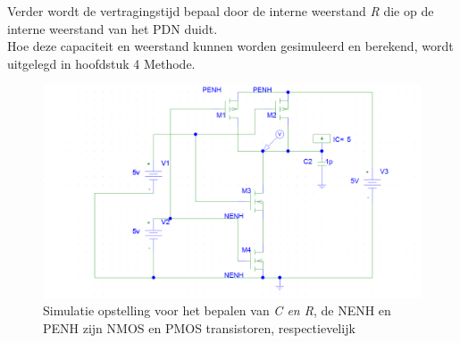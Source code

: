 \documentclass{article}
\begin{document}
Verder wordt de vertragingstijd bepaal door de interne weerstand \emph{R}  die op de interne weerstand van het PDN duidt.\\

Hoe deze capaciteit en weerstand kunnen worden gesimuleerd en berekend, wordt uitgelegd in hoofdstuk 4 Methode.

 \begin{figure} [h!]
 \begin{center}
 \includegraphics [scale = 0.4] {figures/PDN}
 \caption{Simulatie opstelling voor het bepalen van \emph{C en R}, de NENH en PENH zijn NMOS en PMOS transistoren, respectievelijk}
 \label{res:PDN_schakeling}
 \end{center}
 \end{figure}
\end{document}
